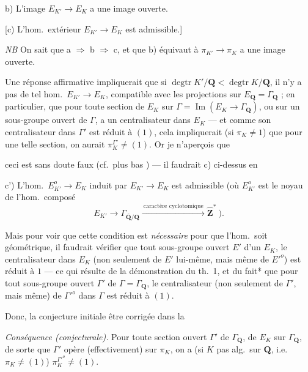 \documentclass[11pt,a4paper]{article}
\begin{document}
b) L'image  $E_{K'} \to E_K$ a une image ouverte.

[c) L'hom.\ extérieur $E_{K'} \to E_K$ est admissible.]

\emph{NB} On sait que a $\Rightarrow$ b $\Rightarrow$ c, et que b) équivaut à
$\pi_{K'} \to \pi_K$ a une image ouverte.

Une réponse affirmative impliquerait que si
$\operatorname{degtr} K'/\mathbf{Q} < \operatorname{degtr} K/\mathbf{Q}$, il n'y a pas
de tel hom.\ $E_{K'} \to E_K$, compatible avec les projections sur
$E_{\mathbf{Q}} = \Gamma_{\mathbf{Q}}$ ; en particulier, 
 que pour toute section de $E_K$ sur
$\Gamma = \operatorname{Im}(E_K \to \Gamma_{\mathbf{Q}})$, ou sur un sous-groupe
 ouvert de $\Gamma$, a un centralisateur 
 dans $E_K$ — et comme son centralisateur dans $\Gamma'$ est
réduit à $(1)$, cela impliquerait (si $\pi_K \neq 1$) que pour une telle
section, on aurait $\pi_K^{\Gamma'} \neq (1)$. Or je n'aperçois que

ceci est sans doute faux (cf.\ plus bas ) — il faudrait
  c) ci-dessus en

c') L'hom.\ $E^{o}_{K'} \to E_K$ induit par $E_{K'} \to E_K$ est admissible
(où $E^{o}_{K'}$ est le noyau de l'hom.\ composé
\[
  E_{K'} \longrightarrow \Gamma_{\overline{\mathbf{Q}}/\mathbf{Q}}
  \xrightarrow{\ \text{caractère cyclotomique}\ } \widehat{\mathbf{Z}}^{*}\ ).
\]

Mais pour voir que cette condition est \emph{nécessaire} pour que l'hom.\ soit
géométrique, il faudrait  vérifier que  tout sous-groupe
ouvert $E'$ d'un $E_K$, le centralisateur dans $E_K$ (non seulement de $E'$
lui-même, mais même de $E'^{o}$) est réduit à $1$ — ce qui résulte de la
démonstration du th.~1, et du fait* que pour tout sous-groupe ouvert $\Gamma'$
de $\Gamma = \Gamma_{\mathbf{Q}}$, le centralisateur (non seulement de
$\Gamma'$, mais même) de $\Gamma'^{o}$ dans $\Gamma$ est réduit à $(1)$.

Donc, la conjecture initiale  être corrigée dans la

\emph{Conséquence (conjecturale).} Pour toute \add{\ill{}} section
 ouvert $\Gamma'$ de $\Gamma_{\mathbf{Q}}$,
\struck{\ill{}} de $E_K$ sur $\Gamma_{\mathbf{Q}}$,  de sorte que $\Gamma'$ opère (effectivement) sur $\pi_K$, on a (si $K$
pas alg.\ sur $\mathbf{Q}$, i.e.\ $\pi_K \neq (1)$)
$\pi_K^{\Gamma'^{o}} \neq (1)$.
\end{document}
